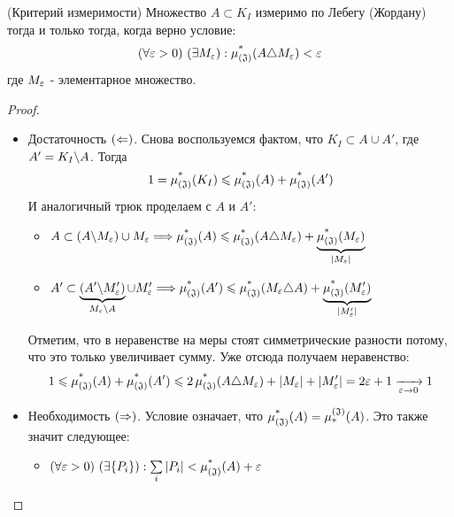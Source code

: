 \begin{theorem} (Критерий измеримости)
	Множество $A \subset K_I$ измеримо по Лебегу (Жордану) тогда и только тогда, когда верно условие:
	\[
		(\forall \eps > 0)\ (\exists M_\eps) : \upjlm(A \tr M_\eps) < \eps
	\]
	где $M_\eps$ - элементарное множество.
\end{theorem}

\begin{proof}~
	\begin{itemize}
		\item Достаточность $(\La)$. Снова воспользуемся фактом, что $K_I \subset A \cup A'$, где $A' = K_I \bs A$. Тогда
		\[
			1 = \upjlm(K_I) \le \upjlm(A) + \upjlm(A')
		\]
		И аналогичный трюк проделаем с $A$ и $A'$:
		\begin{itemize}
			\item \(A \subset (A \bs M_\eps) \cup M_\eps \Longrightarrow \upjlm(A) \le \upjlm(A \tr M_\eps) + \underbrace{\upjlm(M_\eps)}_{|M_\eps|}\)
			
			\item \(A' \subset \underbrace{(A' \bs M'_\eps)}_{M_\eps \bs A} \cup M'_\eps \Longrightarrow \upjlm(A') \le \upjlm(M_\eps \tr A) + \underbrace{\upjlm(M'_\eps)}_{|M'_\eps|}\)
		\end{itemize}
		Отметим, что в неравенстве на меры стоят симметрические разности потому, что это только увеличивает сумму. Уже отсюда получаем неравенство:
		\[
			1 \le \upjlm(A) + \upjlm(A') \le 2\upjlm(A \tr M_\eps) + |M_\eps| + |M'_\eps| = 2\eps + 1 \xrightarrow[\eps \to 0]{} 1
		\]
		
		\item Необходимость $(\Ra)$. Условие означает, что $\upjlm(A) = \downjlm(A)$. Это также значит следующее:
		\begin{itemize}
			\item \((\forall \eps > 0)\ (\exists \{P_i\}) : \suml_i |P_i| < \upjlm(A) + \eps\)
			

\end{itemize}
\end{itemize}
\end{proof}
